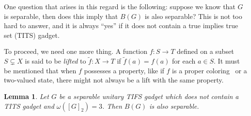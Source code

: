 \documentclass[%
12pt,
prereprint,
showpacs,
showkeys,
preprintnumbers,
amsmath,amssymb,
aps,
pra,
longbibliography,
notitlepage
]{revtex4-1}
\newtheorem{lemma}[theorem]{{\color{THM}Lemma}}
\theoremstyle{definition}
\begin{document}
	One question that arises in this regard is the following: suppose we know that $G$ is separable, then does this imply that $B(G)$ is also separable? This is not too hard to answer, and it is always ``yes'' if it does not contain a true implies true set (TITS) gadget.
	
	To proceed, we need one more thing. A function $f:S\longrightarrow T$ defined on a subset $S\subsetneq X$ is said to be \emph{lifted} to $\tilde{f}:X\longrightarrow T$ if $\tilde{f}(a)=f(a)$ for each $a\in S$. It must be mentioned that when $f$ possesses a property, like if $f$ is a proper coloring~\cite{ALBERTSON1998189} or a two-valued state, there might not always be a lift with the same property.
	
	\begin{lemma}\label{Sep-lem}
		Let $G$ be a separable unitary TIFS gadget which does not contain a TITS gadget and $\omega ([G]_2)=3$. Then $B(G)$ is also separable.
	\end{lemma}
	
\end{document}
